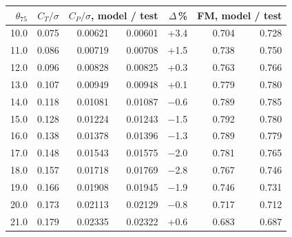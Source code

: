 \begin{tabular}{@{}rrrrrrr@{}}
\toprule
$\theta_{75}$ & $C_T/\sigma$ & \multicolumn{2}{c}{$C_P/\sigma$, model / test} & $\Delta$\,\% & \multicolumn{2}{c}{FM, model / test} \\
\midrule
10.0 & 0.075 & 0.00621 & 0.00601 & +3.4 & 0.704 & 0.728 \\
11.0 & 0.086 & 0.00719 & 0.00708 & +1.5 & 0.738 & 0.750 \\
12.0 & 0.096 & 0.00828 & 0.00825 & +0.3 & 0.763 & 0.766 \\
13.0 & 0.107 & 0.00949 & 0.00948 & +0.1 & 0.779 & 0.780 \\
14.0 & 0.118 & 0.01081 & 0.01087 & $-$0.6 & 0.789 & 0.785 \\
15.0 & 0.128 & 0.01224 & 0.01243 & $-$1.5 & 0.792 & 0.780 \\
16.0 & 0.138 & 0.01378 & 0.01396 & $-$1.3 & 0.789 & 0.779 \\
17.0 & 0.148 & 0.01543 & 0.01575 & $-$2.0 & 0.781 & 0.765 \\
18.0 & 0.157 & 0.01718 & 0.01769 & $-$2.8 & 0.767 & 0.746 \\
19.0 & 0.166 & 0.01908 & 0.01945 & $-$1.9 & 0.746 & 0.731 \\
20.0 & 0.173 & 0.02113 & 0.02129 & $-$0.8 & 0.717 & 0.712 \\
21.0 & 0.179 & 0.02335 & 0.02322 & +0.6 & 0.683 & 0.687 \\
\bottomrule
\end{tabular}
